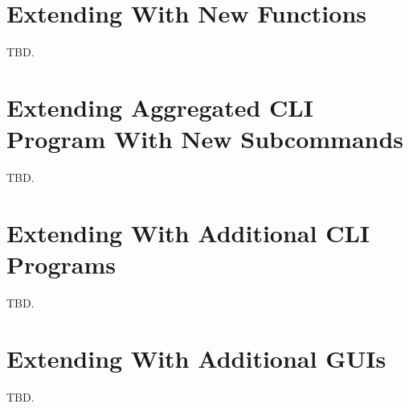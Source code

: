 \section{Extending \emph{\scriptinglanguagenameuc{}} With New Functions}
\label{cwbe0:secn0}

TBD.


\section{Extending Aggregated CLI Program With New Subcommands}
\label{cwbe0:secs0}

TBD.


\section{Extending \emph{\productname} With Additional CLI Programs}
\label{cwbe0:seac0}

TBD.


\section{Extending \emph{\productname} With Additional GUIs}
\label{cwbe0:segu0}

TBD.



